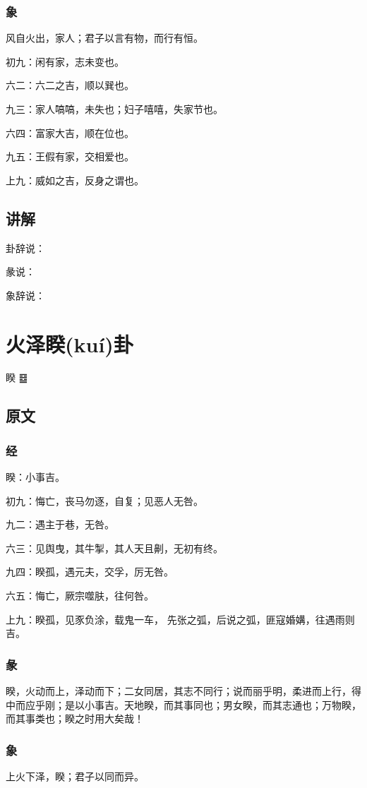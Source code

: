 \documentclass[12pt,oneside]{book}
\begin{document}
\subsection{象}
风自火出，家人；君子以言有物，而行有恒。

初九：闲有家，志未变也。

六二：六二之吉，顺以巽也。

九三：家人嗃嗃，未失也；妇子嘻嘻，失家节也。

六四：富家大吉，顺在位也。

九五：王假有家，交相爱也。

上九：威如之吉，反身之谓也。

\section{讲解}
卦辞说：

彖说：

象辞说：

\chapter{火泽睽(kuí)卦}
睽 {\Large ䷥}

\section{原文}

\subsection{经}
睽：小事吉。

初九：悔亡，丧马勿逐，自复；见恶人无咎。

九二：遇主于巷，无咎。

六三：见舆曳，其牛掣，其人天且劓，无初有终。

九四：睽孤，遇元夫，交孚，厉无咎。

六五：悔亡，厥宗噬肤，往何咎。

上九：睽孤，见豕负涂，载鬼一车， 先张之弧，后说之弧，匪寇婚媾，往遇雨则吉。

\subsection{彖}
睽，火动而上，泽动而下；二女同居，其志不同行；说而丽乎明，柔进而上行，得中而应乎刚；是以小事吉。天地睽，而其事同也；男女睽，而其志通也；万物睽，而其事类也；睽之时用大矣哉！

\subsection{象}
上火下泽，睽；君子以同而异。
\end{document}
